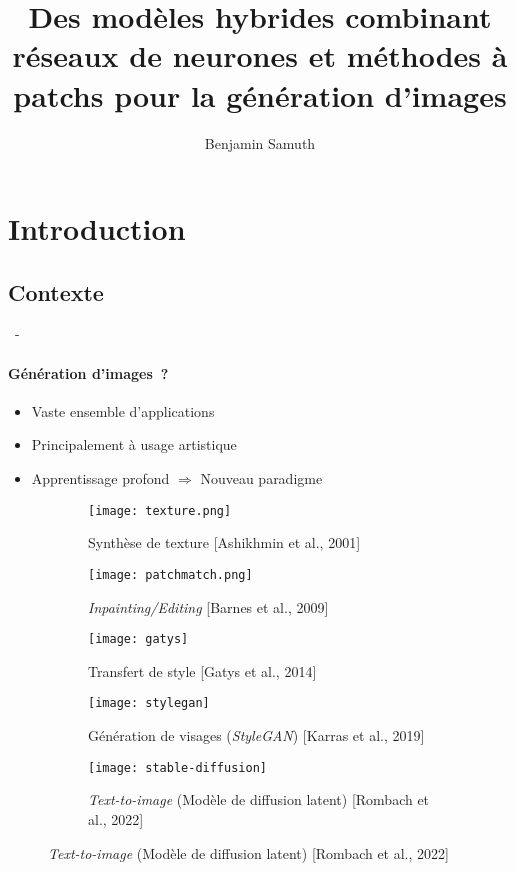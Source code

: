 \documentclass[aspectratio=169, 22pt]{beamer}
\title[Modèles hybrides pour la génération d'images]{Des modèles hybrides combinant réseaux de neurones et méthodes à patchs pour la génération d'images}
\subtitle{}
\author[Benjamin Samuth]{Benjamin Samuth}
\institute[Normandie University]{Normandie Univ, UNICAEN, ENSICAEN, CNRS, GREYC, Caen, FRANCE}
\begin{document}
\begin{frame}
  \titlepage
\end{frame}

\section{Introduction}

\subsection{Contexte}
\begin{frame}{\secname~- \subsecname}
  \framesubtitle{Génération d'images~?}
      \begin{itemize}
      \item Vaste ensemble d'applications
      \item Principalement à usage artistique
      \item Apprentissage profond $\Rightarrow$ \alert{Nouveau paradigme}
      \end{itemize}
      
      \begin{figure}
        \begin{subfigure}{0.17\linewidth}
          \texttt{[image: texture.png]}
          \caption{\footnotesize Synthèse de texture [Ashikhmin et al., 2001]}
        \end{subfigure}
        \begin{subfigure}{0.17\linewidth}
          \texttt{[image: patchmatch.png]}
          \caption{\footnotesize \emph{Inpainting/Editing} [Barnes et al., 2009]}
        \end{subfigure}        
        \begin{subfigure}{0.17\linewidth}
          \texttt{[image: gatys]}
          \caption{\footnotesize Transfert de style [Gatys et al., 2014]}          
        \end{subfigure}
        \begin{subfigure}{0.17\linewidth}
          \texttt{[image: stylegan]}
          \caption{\footnotesize Génération de visages (\emph{StyleGAN}) [Karras et al., 2019]}
        \end{subfigure}        
        \begin{subfigure}{0.17\linewidth}
          \texttt{[image: stable-diffusion]}
          \caption{\footnotesize \emph{Text-to-image} (Modèle de diffusion latent) [Rombach et al., 2022]}
        \end{subfigure}
      \end{figure}
\end{frame}
\end{document}
